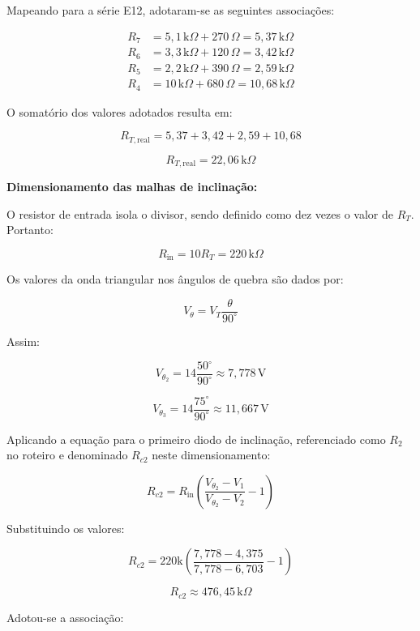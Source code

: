 \documentclass[11pt,a4paper]{article}
\begin{document}
\begin{itemize}
    Mapeando para a série E12, adotaram-se as seguintes associações:

    \begin{align*}
        R_7&=5{,}1\,\text{k}\Omega+270\,\Omega
        =5{,}37\,\text{k}\Omega\\
        R_6&=3{,}3\,\text{k}\Omega+120\,\Omega
        =3{,}42\,\text{k}\Omega\\
        R_5&=2{,}2\,\text{k}\Omega+390\,\Omega
        =2{,}59\,\text{k}\Omega\\
        R_4&=10\,\text{k}\Omega+680\,\Omega
        =10{,}68\,\text{k}\Omega
    \end{align*}

    O somatório dos valores adotados resulta em:

    \[
    R_{T,\text{real}}=
    5{,}37+3{,}42+2{,}59+10{,}68
    \]

    \[
    \boxed{R_{T,\text{real}}=22{,}06\,\text{k}\Omega}
    \]

    \textbf{Dimensionamento das malhas de inclinação:}

    O resistor de entrada isola o divisor, sendo definido como
    dez vezes o valor de $R_T$. Portanto:

    \[
    R_{\text{in}}=10R_T=220\,\text{k}\Omega
    \]

    Os valores da onda triangular nos ângulos de quebra são dados por:

    \[
    V_\theta=V_T\frac{\theta}{90^\circ}
    \]

    Assim:

    \[
    V_{\theta_2}=14\frac{50^\circ}{90^\circ}
    \approx7{,}778\,\text{V}
    \]

    \[
    V_{\theta_3}=14\frac{75^\circ}{90^\circ}
    \approx11{,}667\,\text{V}
    \]

    Aplicando a equação para o primeiro diodo de inclinação,
    referenciado como $R_2$ no roteiro e denominado $R_{c2}$
    neste dimensionamento:

    \[
    R_{c2}=R_{\text{in}}
    \left(
    \frac{V_{\theta_2}-V_1}
    {V_{\theta_2}-V_2}-1
    \right)
    \]

    Substituindo os valores:

    \[
    R_{c2}=220\text{k}
    \left(
    \frac{7{,}778-4{,}375}
    {7{,}778-6{,}703}-1
    \right)
    \]

    \[
    \boxed{R_{c2}\approx476{,}45\,\text{k}\Omega}
    \]

    Adotou-se a associação:


\end{itemize}
\end{document}
